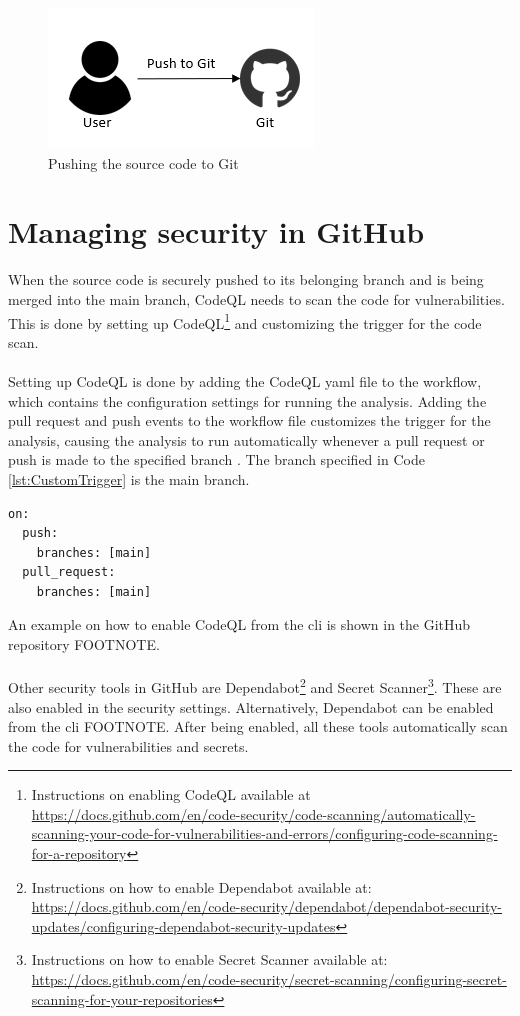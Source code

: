 \vspace{2mm}
\begin{figure}[H]
    \centering
    \includegraphics[width=0.5\columnwidth]{Images/aws-piplin-1.png}
    \caption{Pushing the source code to Git}
    \label{fig: Pushing the source code to Git}
\end{figure}

\section{Managing security in GitHub}
\label{Managing security in GitHub}
When the source code is securely pushed to its belonging branch and is being merged into the main branch, CodeQL needs to scan the code for vulnerabilities. This is done by setting up CodeQL\footnote{Instructions on enabling CodeQL available at \url{https://docs.github.com/en/code-security/code-scanning/automatically-scanning-your-code-for-vulnerabilities-and-errors/configuring-code-scanning-for-a-repository}} and customizing the trigger for the code scan. 
\\~\\
Setting up CodeQL is done by adding the CodeQL \acrshort{yaml} file to the workflow, which contains the configuration settings for running the analysis. Adding the pull request and push events to the workflow file customizes the trigger for the analysis, causing the analysis to run automatically whenever a pull request or push is made to the specified branch \cite{CodeQLCustom}. The branch specified in Code \ref{lst:CustomTrigger} is the main branch. 

\vspace{2mm}
\begin{lstlisting}[language=terraform, caption=Custom trigger for CodeQL alerts, captionpos=b, frame=single, label=lst:CustomTrigger]
on:
  push:
    branches: [main]
  pull_request:
    branches: [main]
\end{lstlisting}

An example on how to enable CodeQL from the \acrshort{cli} is shown in the GitHub repository FOOTNOTE.
\\~\\
Other security tools in GitHub are Dependabot\footnote{Instructions on how to enable Dependabot available at: \url{https://docs.github.com/en/code-security/dependabot/dependabot-security-updates/configuring-dependabot-security-updates}} and Secret Scanner\footnote{Instructions on how to enable Secret Scanner available at: \url{https://docs.github.com/en/code-security/secret-scanning/configuring-secret-scanning-for-your-repositories}}. These are also enabled in the security settings. Alternatively, Dependabot can be enabled from the \acrshort{cli} FOOTNOTE. After being enabled, all these tools automatically scan the code for vulnerabilities and secrets.

